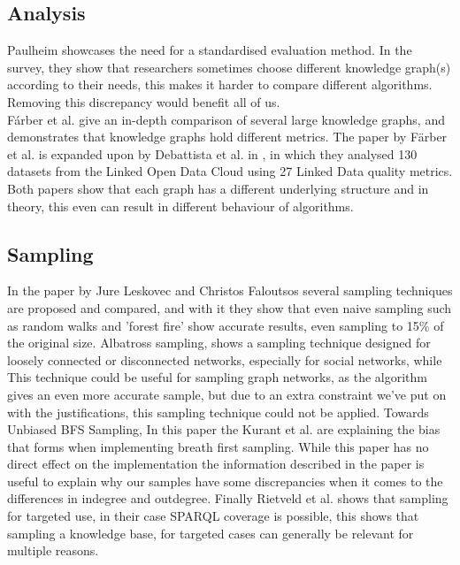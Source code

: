 \documentclass{article}
\begin{document}
\subsection{Analysis}
Paulheim \cite{HeikoP:2016} showcases the need for a standardised evaluation method. In the survey, they show that researchers sometimes choose different knowledge graph(s) according to their needs, this makes it harder to compare different algorithms. Removing this discrepancy would benefit all of us.\\ 
F\'arber et al. \cite{MichaelF:2017} give an in-depth comparison of several large knowledge graphs, and demonstrates that knowledge graphs hold different metrics. The paper by F\"arber et al. \cite{MichaelF:2017} is expanded upon by Debattista et al. in \cite{Debattista:2018}, in which they analysed 130 datasets from the Linked Open Data Cloud using 27 Linked Data quality metrics. Both papers show that each graph has a different underlying structure and in theory, this even can result in different behaviour of algorithms.

\subsection{Sampling}
In the paper by Jure Leskovec and Christos Faloutsos \cite{Leskovec:2006} several sampling techniques are proposed and compared, and with it they show that even naive sampling such as random walks and 'forest fire' show accurate results, even sampling to 15\% of the original size. 
\cite{Jin:2011} Albatross sampling, shows a sampling technique designed for loosely connected or disconnected networks, especially for social networks, while
This technique could be useful for sampling graph networks, as the algorithm gives an even more accurate sample, but due to an extra constraint we've put on with the justifications, this sampling technique could not be applied.
\cite{Kurant:2011} Towards Unbiased BFS Sampling, In this paper the Kurant et al. are explaining the bias that forms when implementing breath first sampling.
While this paper has no direct effect on the implementation the information described in the paper is useful to explain why our samples have some discrepancies when it comes to the differences in indegree and outdegree. 
Finally Rietveld et al.\cite{Rietveld:2014} shows that sampling for targeted use, in their case SPARQL coverage is possible, this shows that sampling a knowledge base, for targeted cases can generally be relevant for multiple reasons.
\end{document}
